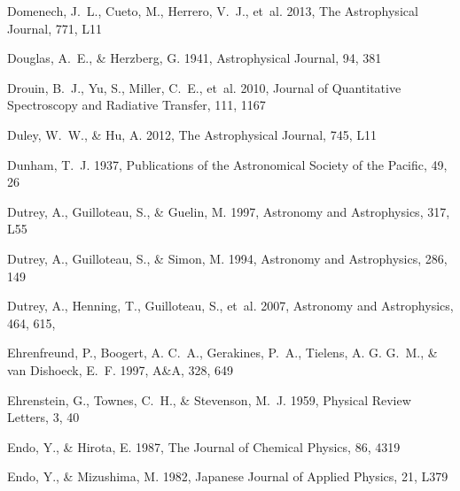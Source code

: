 \documentclass[twocolumn]{aastex631}
\begin{document}
\begin{thebibliography}{}
Domenech, J.~L., Cueto, M., Herrero, V.~J., {et~al.} 2013, The Astrophysical
  Journal, 771, L11

Douglas, A.~E., \& Herzberg, G. 1941, Astrophysical Journal, 94, 381

Drouin, B.~J., Yu, S., Miller, C.~E., {et~al.} 2010, Journal of Quantitative
  Spectroscopy and Radiative Transfer, 111, 1167

Duley, W.~W., \& Hu, A. 2012, The Astrophysical Journal, 745, L11

Dunham, T.~J. 1937, Publications of the Astronomical Society of the Pacific,
  49, 26

{Dutrey}, A., {Guilloteau}, S., \& {Guelin}, M. 1997, Astronomy and
  Astrophysics, 317, L55

{Dutrey}, A., {Guilloteau}, S., \& {Simon}, M. 1994, Astronomy and
  Astrophysics, 286, 149

{Dutrey}, A., {Henning}, T., {Guilloteau}, S., {et~al.} 2007, Astronomy and
  Astrophysics, 464, 615, 

Ehrenfreund, P., Boogert, A. C.~A., Gerakines, P.~A., Tielens, A. G. G.~M., \&
  van Dishoeck, E.~F. 1997, A{\&}A, 328, 649

Ehrenstein, G., Townes, C.~H., \& Stevenson, M.~J. 1959, Physical Review
  Letters, 3, 40

Endo, Y., \& Hirota, E. 1987, The Journal of Chemical Physics, 86, 4319

Endo, Y., \& Mizushima, M. 1982, Japanese Journal of Applied Physics, 21, L379


\end{thebibliography}
\end{document}

